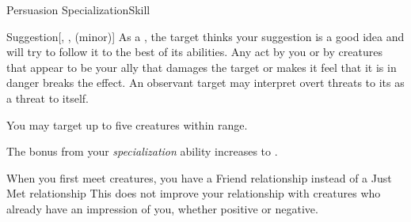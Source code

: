 \begin{feat}{Persuasion Specialization}{Skill}
\begin{freeability}{Suggestion}[, ,  (minor)]
            \hit As a , the target thinks your suggestion is a good idea and will try to follow it to the best of its abilities.
            Any act by you or by creatures that appear to be your ally that damages the target or makes it feel that it is in danger breaks the effect.
            An observant target may interpret overt threats to its  as a threat to itself.

            \rankline
             You may target up to five creatures within range.
        \end{freeability}

         The bonus from your \textit{specialization} ability increases to .

         When you first meet creatures, you have a Friend relationship instead of a Just Met relationship
        This does not improve your relationship with creatures who already have an impression of you, whether positive or negative.
    \end{feat}

